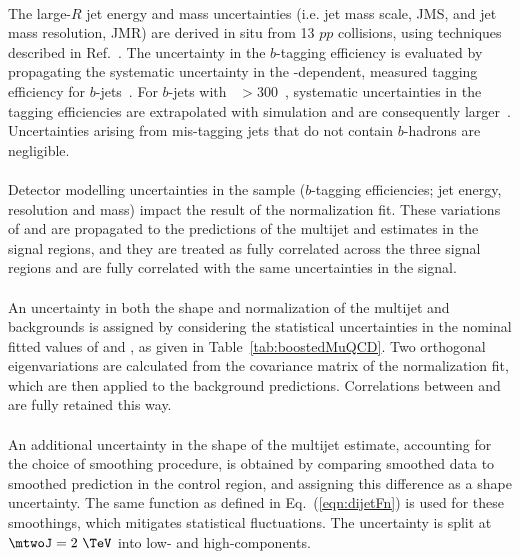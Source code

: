 \paragraph{}
The large-$R$ jet energy and mass uncertainties (i.e. jet mass scale, JMS, and jet mass resolution, JMR) are derived in situ from 13 \TeV{} $pp$ collisions, using techniques described in Ref.~\cite{JetMassAndSubstructure}. 
The uncertainty in the $b$-tagging efficiency is evaluated by propagating the systematic uncertainty in the \pt-dependent, measured tagging efficiency for $b$-jets~\cite{ATLAS-CONF-2014-004}. 
For $b$-jets with \pt~$> 300$~\GeV, systematic uncertainties in the tagging efficiencies are extrapolated with simulation and are consequently larger~\cite{Aad:2015ydr}. 
Uncertainties arising from mis-tagging jets that do not contain $b$-hadrons are negligible.

\paragraph{}
Detector modelling uncertainties in the \ttbar sample ($b$-tagging efficiencies; jet energy, resolution and mass) impact the result of the normalization fit. These variations of \muqcd and \alphatt  are propagated to the predictions of the multijet and \ttbar estimates in the signal regions, and they are treated as fully correlated across the three signal regions and are fully correlated with the same uncertainties in the signal.

\paragraph{}
An uncertainty in both the shape and normalization of the multijet and \ttbar backgrounds is assigned by considering the statistical uncertainties in the nominal fitted values of \alphatt and \muqcd, as given in Table~\ref{tab:boostedMuQCD}. 
Two orthogonal eigenvariations are calculated from the covariance matrix of the normalization fit, which are then applied to the background predictions. 
Correlations between \alphatt and \muqcd are fully retained this way.

\paragraph{}
An additional uncertainty in the shape of the multijet estimate, accounting for the choice of smoothing procedure, is obtained by comparing smoothed data to smoothed prediction in the control region, and assigning this difference as a shape uncertainty. 
The same function as defined in Eq.~(\ref{eqn:dijetFn}) is used for these smoothings, which mitigates statistical fluctuations. The uncertainty is split at $\mtwoJ = 2~\TeV$ into low- and high-\mtwoJ components.

